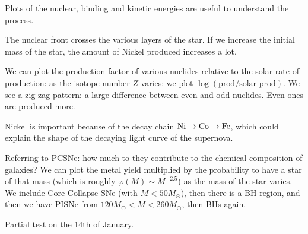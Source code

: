 \documentclass[main.tex]{subfiles}
\begin{document}
Plots of the nuclear, binding and kinetic energies are useful to understand the process. 

The nuclear front crosses the various layers of the star. 
If we increase the initial mass of the star, the amount of Nickel produced increases a lot. 

We can plot the production factor of various nuclides relative to the solar rate of production: as the isotope number \(Z\) varies: we plot \(\log (\text{prod} / \text{solar prod})\). We see a zig-zag pattern: a large difference between even and odd nuclides. Even ones are produced more. 

Nickel is important because of the decay chain \(\ce{Ni} \rightarrow \ce{Co} \rightarrow \ce{Fe}\), which could explain the shape of the decaying light curve of the supernova. 

Referring to PCSNe: how much to they contribute to the chemical composition of galaxies? 
We can plot the metal yield multiplied by the probability to have a star of that mass (which is roughly \(\varphi (M) \sim M^{-2.5}\)) as the mass of the star varies. We include Core Collapse SNe (with \(M < 50 M_{\odot}\)), then there is a BH region, and then we have PISNe from \(120 M_{\odot}< M < 260 M_{\odot}\), then BHs again. 

Partial test on the 14th of January.
\end{document}
